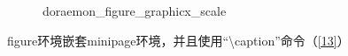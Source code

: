 \documentclass{article}
\begin{document}
    \begin{figure}[htbp]
        \centering
        \hfill
        \hfill
        \caption{doraemon\_figure\_graphicx\_scale}
        \label{12}
    \end{figure}

    figure环境嵌套minipage环境，并且使用``\textbackslash caption{}''命令（\ref{13}）
\end{document}
